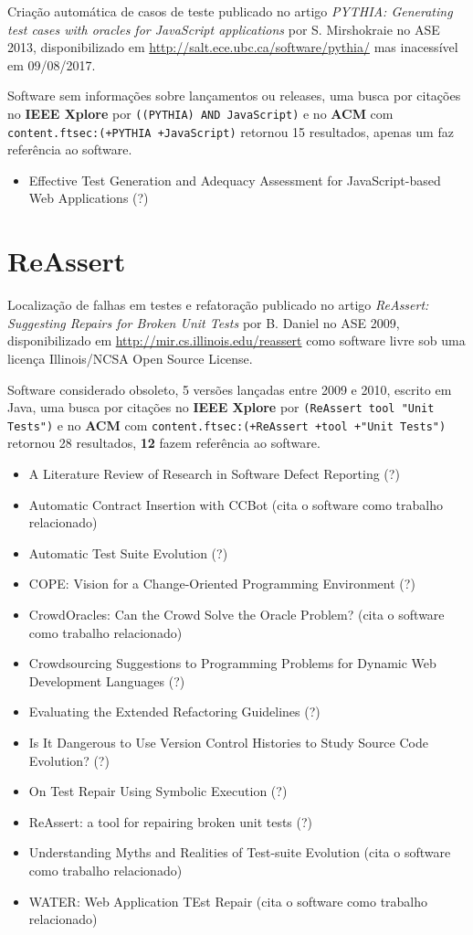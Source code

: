 Criação automática de casos de teste
publicado no artigo {\it PYTHIA: Generating test cases with oracles for JavaScript applications}
por S. Mirshokraie
no ASE 2013,
disponibilizado em \url{http://salt.ece.ubc.ca/software/pythia/}
mas inacessível em 09/08/2017.

Software sem informações sobre lançamentos ou releases,
uma busca por citações no {\bf IEEE Xplore} por
\texttt{((PYTHIA) AND JavaScript)}
e no {\bf ACM} com
\texttt{content.ftsec:(+PYTHIA +JavaScript)}
retornou
15 resultados,
apenas um faz referência ao software.

\begin{itemize}
\item Effective Test Generation and Adequacy Assessment for JavaScript-based Web Applications (?)
\end{itemize}

\section{ReAssert}

Localização de falhas em testes e refatoração
publicado no artigo {\it ReAssert: Suggesting Repairs for Broken Unit Tests}
por B. Daniel
no ASE 2009,
disponibilizado em \url{http://mir.cs.illinois.edu/reassert}
como software livre
sob uma licença Illinois/NCSA Open Source License.

Software considerado obsoleto,
5 versões lançadas
entre 2009 e 2010,
escrito em Java,
uma busca por citações no {\bf IEEE Xplore} por
\texttt{(ReAssert tool "Unit Tests")}
e no {\bf ACM} com
\texttt{content.ftsec:(+ReAssert +tool +"Unit Tests")}
retornou
28 resultados,
{\bf 12} fazem referência ao software.

\begin{itemize}
\item A Literature Review of Research in Software Defect Reporting (?)
\item Automatic Contract Insertion with CCBot (cita o software como trabalho relacionado)
\item Automatic Test Suite Evolution (?)
\item COPE: Vision for a Change-Oriented Programming Environment (?)
\item CrowdOracles: Can the Crowd Solve the Oracle Problem? (cita o software como trabalho relacionado)
\item Crowdsourcing Suggestions to Programming Problems for Dynamic Web Development Languages (?)
\item Evaluating the Extended Refactoring Guidelines (?)
\item Is It Dangerous to Use Version Control Histories to Study Source Code Evolution? (?)
\item On Test Repair Using Symbolic Execution (?)
\item ReAssert: a tool for repairing broken unit tests (?)
\item Understanding Myths and Realities of Test-suite Evolution (cita o software como trabalho relacionado)
\item WATER: Web Application TEst Repair (cita o software como trabalho relacionado)
\end{itemize}

